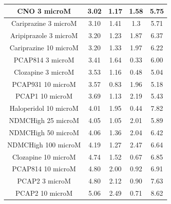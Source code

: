 \begin{table}[h!]
\begin{tabular}{|c|c|c|c|c|}
CNO 3 microM           & 3.02 & 1.17 & 1.58 & 5.75 \\ \hline
Cariprazine 3 microM   & 3.10  & 1.41 & 1.3  & 5.71 \\ \hline
Aripiprazole 3 microM  & 3.20  & 1.23 & 1.87 & 6.37 \\ \hline
Cariprazine 10 microM  & 3.20  & 1.33 & 1.97 & 6.22 \\ \hline
PCAP814 3 microM       & 3.41 & 1.64 & 0.33 & 6.00    \\ \hline
Clozapine 3 microM     & 3.53 & 1.16 & 0.48 & 5.04 \\ \hline
PCAP931 10 microM      & 3.57 & 0.83 & 1.96 & 5.18 \\ \hline
PCAP1 10 microM        & 3.69 & 1.13 & 2.19 & 5.43 \\ \hline
Haloperidol 10 microM  & 4.01 & 1.95 & 0.44 & 7.82 \\ \hline
NDMCHigh 25 microM     & 4.05 & 1.05 & 2.01 & 5.89 \\ \hline
NDMCHigh 50 microM     & 4.06 & 1.36 & 2.04 & 6.42 \\ \hline
NDMCHigh 100 microM    & 4.19 & 1.27 & 2.47 & 6.64 \\ \hline
Clozapine 10 microM    & 4.74 & 1.52 & 0.67 & 6.85 \\ \hline
PCAP814 10 microM      & 4.80  & 2.00    & 0.92 & 6.91 \\ \hline
PCAP2 3 microM         & 4.80  & 2.12 & 0.90  & 7.63 \\ \hline
PCAP2 10 microM        & 5.06 & 2.49 & 0.71 & 8.62 \\ \hline
\end{tabular}
\end{table}
\newpage
